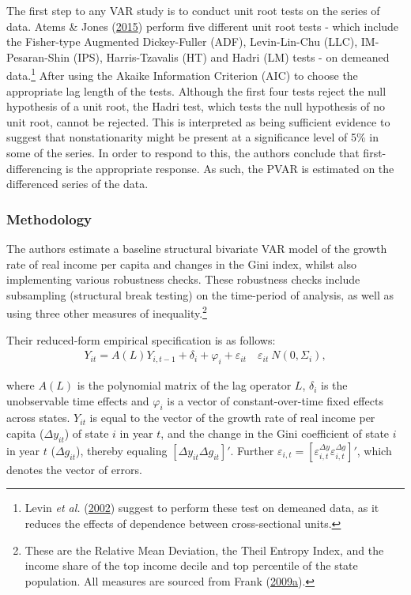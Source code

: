 \documentclass[11pt,preprint, authoryear]{elsarticle}
\numberwithin{equation}{section}
\numberwithin{figure}{section}
\numberwithin{table}{section}
\let\rmarkdownfootnote\footnote%
\def\footnote{\protect\rmarkdownfootnote}
\begin{document}
The first step to any VAR study is to conduct unit root tests on the
series of data. Atems \& Jones (\protect\hyperlink{ref-atems}{2015})
perform five different unit root tests - which include the Fisher-type
Augmented Dickey-Fuller (ADF), Levin-Lin-Chu (LLC), IM-Pesaran-Shin
(IPS), Harris-Tzavalis (HT) and Hadri (LM) tests - on demeaned
data.\footnote{Levin \emph{et al.} (\protect\hyperlink{ref-levin}{2002})
  suggest to perform these test on demeaned data, as it reduces the
  effects of dependence between cross-sectional units.} After using the
Akaike Information Criterion (AIC) to choose the appropriate lag length
of the tests. Although the first four tests reject the null hypothesis
of a unit root, the Hadri test, which tests the null hypothesis of no
unit root, cannot be rejected. This is interpreted as being sufficient
evidence to suggest that nonstationarity might be present at a
significance level of 5\% in some of the series. In order to respond to
this, the authors conclude that first-differencing is the appropriate
response. As such, the PVAR is estimated on the differenced series of
the data.

\hypertarget{methodology}{%
\subsubsection*{Methodology}\label{methodology}}

The authors estimate a baseline structural bivariate VAR model of the
growth rate of real income per capita and changes in the Gini index,
whilst also implementing various robustness checks. These robustness
checks include subsampling (structural break testing) on the time-period
of analysis, as well as using three other measures of
inequality.\footnote{These are the Relative Mean Deviation, the Theil
  Entropy Index, and the income share of the top income decile and top
  percentile of the state population. All measures are sourced from
  Frank
  (\protect\hyperlink{ref-frank}{2009}\protect\hyperlink{ref-frank}{a}).}

Their reduced-form empirical specification is as follows:
\begin{align}\tag{1}
Y_{it} = A(L)Y_{i,t-1} + \delta_i + \varphi_i + \varepsilon_{it} \hspace{12pt} \varepsilon_{it} ~ N(0, \Sigma_{i}), \label{eq1}
\end{align}

where \(A(L)\) is the polynomial matrix of the lag operator \(L\),
\(\delta_i\) is the unobservable time effects and \(\varphi_i\) is a
vector of constant-over-time fixed effects across states. \(Y_{it}\) is
equal to the vector of the growth rate of real income per capita
(\(\Delta y_{it}\)) of state \(i\) in year \(t\), and the change in the
Gini coefficient of state \(i\) in year \(t\) (\(\Delta g_{it}\)),
thereby equaling \([\Delta y_{it} \Delta g_{it} ]'\). Further
\(\varepsilon_{i,t} = [\varepsilon_{i,t}^{\Delta y} \varepsilon_{i,t}^{\Delta g}]'\),
which denotes the vector of errors.
\end{document}
